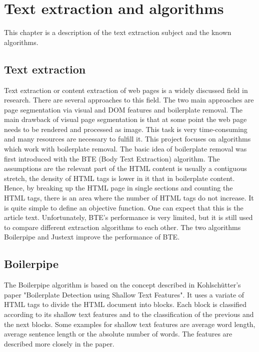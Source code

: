  \section{Text extraction and algorithms}

 This chapter is a description of the text extraction subject and the known algorithms.

 \subsection{Text extraction}

 Text extraction or content extraction of web pages is a widely discussed field in research. There are several approaches to this field. The two main approaches are page segmentation via visual and DOM features and boilerplate removal. The main drawback of visual page segmentation is that at some point the web page needs to be rendered and processed as image. This task is very time-consuming and many resources are necessary to fulfill it. This project focuses on algorithms which work with boilerplate removal.
 The basic idea of boilerplate removal was first introduced with the BTE (Body Text Extraction) algorithm. The assumptions are the relevant part of the HTML content is usually a contiguous stretch, the density of HTML tags is lower in it that in boilerplate content. Hence, by breaking up the HTML page in single sections and counting the HTML tags, there is an area where the number of HTML tags do not increase. It is quite simple to define an objective function. One can expect that this is the article text. Unfortunately, BTE's performance is very limited, but it is still used to compare different extraction algorithms to each other. The two algorithms Boilerpipe and Justext improve the performance of BTE.

 \subsection{Boilerpipe}

 The Boilerpipe algorithm is based on the concept described in Kohlschütter's paper "Boilerplate Detection using Shallow Text Features". It uses a variate of HTML tags  to divide the HTML document into blocks. Each block is classified according to its shallow text features and to the classification of the  previous and the next blocks. Some examples for shallow text features are average word length, average sentence length or the absolute number of words. The features are described more closely in the paper.

